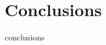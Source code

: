 \documentclass[dissertation.tex]{subfiles}
\begin{document}
\chapter{Conclusions}\label{cha:conclusions}
conclusions
\end{document}
